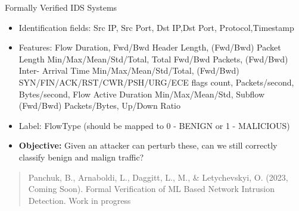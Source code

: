 \documentclass[t,compress,aspectratio=169]{beamer}
\begin{document}
\begin{frame}[fragile]{Formally Verified IDS Systems}
    \begin{itemize}
        \item Identification fields: Src IP, Src Port, Dst IP,Dst Port, Protocol,Timestamp
        \item Features: Flow Duration, Fwd/Bwd Header Length, (Fwd/Bwd) Packet Length Min/Max/Mean/Std/Total, Total Fwd/Bwd Packets, (Fwd/Bwd) Inter- Arrival Time Min/Max/Mean/Std/Total, (Fwd/Bwd) SYN/FIN/ACK/RST/CWR/PSH/URG/ECE flags count, Packets/second, Bytes/second, Flow Active Duration Min/Max/Mean/Std, Subflow (Fwd/Bwd) Packets/Bytes, Up/Down Ratio
        \item Label: FlowType (should be mapped to 0 - BENIGN or 1 - MALICIOUS)
         \item \textbf{\textcolor{aisecred}{Objective:}} Given an attacker can perturb these, can we still correctly classify benign and malign traffic?

    \end{itemize}
    
    

	\begin{quote}
		\tiny Panchuk, B., {Arnaboldi, L.}, Daggitt, L., M., \& Letychevskyi, O. (2023, Coming Soon). Formal Verification of ML Based Network Intrusion Detection. Work in progress
		
	\end{quote}

    
\end{frame}


\end{document}
